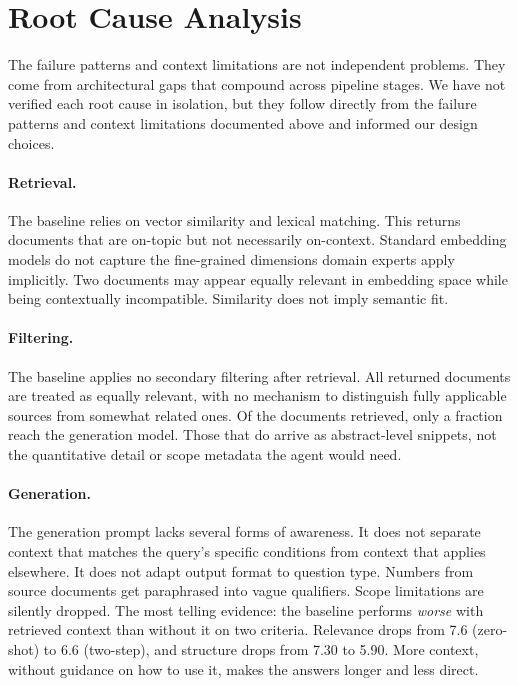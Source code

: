 \section{Root Cause Analysis}
\label{sec:root-causes}

The failure patterns and context limitations are not independent problems. They come from architectural gaps that compound across pipeline stages. We have not verified each root cause in isolation, but they follow directly from the failure patterns and context limitations documented above and informed our design choices.

\paragraph{Retrieval.} The baseline relies on vector similarity and lexical matching. This returns documents that are on-topic but not necessarily on-context. Standard embedding models do not capture the fine-grained dimensions domain experts apply implicitly. Two documents may appear equally relevant in embedding space while being contextually incompatible. Similarity does not imply semantic fit.

\paragraph{Filtering.} The baseline applies no secondary filtering after retrieval. All returned documents are treated as equally relevant, with no mechanism to distinguish fully applicable sources from somewhat related ones. Of the documents retrieved, only a fraction reach the generation model. Those that do arrive as abstract-level snippets, not the quantitative detail or scope metadata the agent would need.

\paragraph{Generation.} The generation prompt lacks several forms of awareness. It does not separate context that matches the query's specific conditions from context that applies elsewhere. It does not adapt output format to question type. Numbers from source documents get paraphrased into vague qualifiers. Scope limitations are silently dropped. The most telling evidence: the baseline performs \emph{worse} with retrieved context than without it on two criteria. Relevance drops from 7.6 (zero-shot) to 6.6 (two-step), and structure drops from 7.30 to 5.90. More context, without guidance on how to use it, makes the answers longer and less direct.


